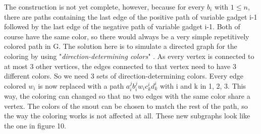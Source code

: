 \documentclass[12pt,a4paper]{article}
\begin{document}
\newline
The construction is not yet complete, however, because for every $b_i$ with $1 \leq n$, there are paths containing the last edge of the positive path of variable gadget i-1 followed by the last edge of the negative path of variable gadget i-1. Both of course have the same color, so there would always be a very simple repetitively colored path in G. The solution here is to simulate a directed graph for the coloring by using "\textit{direction-determining colors}" \citep[p. 6]{Manin2008}. As every vertex is connected to at most 3 other vertices, the edges connected to that vertex need to have 3 different colors. So we need 3 sets of direction-determining colors. Every edge colored $w_i$ is now replaced with a path $a^j_ib^j_iw_ic^i_kd^i_k$ with i and k in {1, 2, 3}. This way, the coloring can changed so that no two edges with the same color share a vertex. The colors of the snout can be chosen to match the rest of the path, so the way the coloring works is not affected at all. These new subgraphs look like the one in figure 10.
\newline
\end{document}
